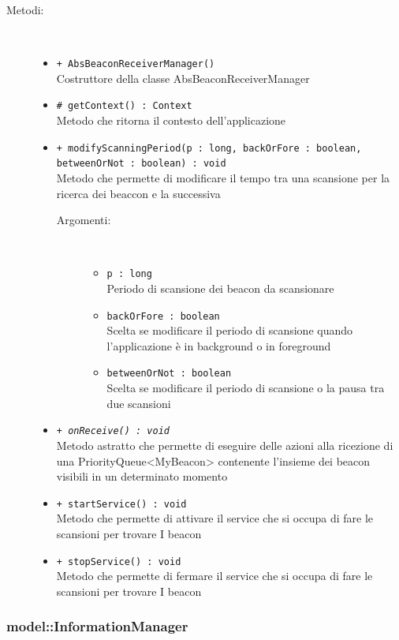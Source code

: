 \documentclass[../DefinizioneDiProdotto.tex]{subfiles}
\begin{document}
\begin{description}
\begin{itemize}
\end{itemize}
\item[Metodi:] \
\begin{itemize}
\item \texttt{+ AbsBeaconReceiverManager()}\\
Costruttore della classe AbsBeaconReceiverManager
 \item \texttt{\# getContext() : Context}\\
Metodo che ritorna il contesto dell'applicazione
 \item \texttt{+ modifyScanningPeriod(p : long, backOrFore : boolean, betweenOrNot : boolean) : void}\\
Metodo che permette di modificare il tempo tra una scansione per la ricerca dei beaccon e la successiva
 \begin{description}
\item[Argomenti:] \
\begin{itemize}
\item \texttt{p : long}\\
Periodo di scansione dei beacon da scansionare\item \texttt{backOrFore : boolean}\\
Scelta se modificare il periodo di scansione quando l'applicazione è in background o in foreground\item \texttt{betweenOrNot : boolean}\\
Scelta se modificare il periodo di scansione o la pausa tra due scansioni\end{itemize}
\end{description}
\item \texttt{+ \textit{onReceive() : void}}\\
Metodo astratto che permette di eseguire delle azioni alla ricezione di una PriorityQueue<MyBeacon> contenente l'insieme dei beacon visibili in un determinato momento
 \item \texttt{+ startService() : void}\\
Metodo che permette di attivare il service che si occupa di fare le scansioni per trovare I beacon
 \item \texttt{+ stopService() : void}\\
Metodo che permette di fermare il service che si occupa di fare le scansioni per trovare I beacon
 \end{itemize}
\end{description}

\subsubsection{model::InformationManager}
\end{document}
